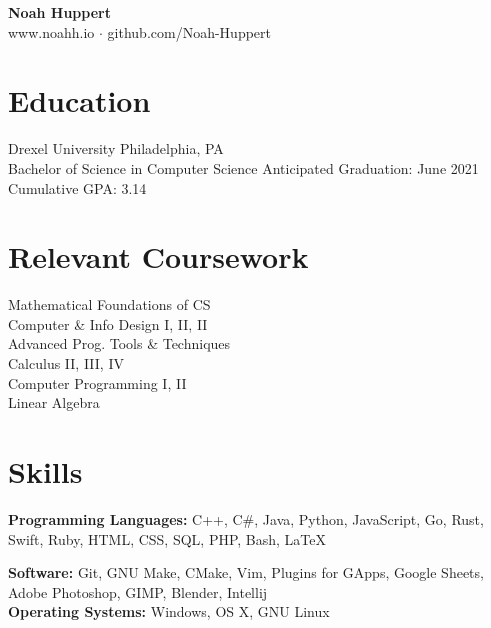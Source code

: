 \documentclass[10pt]{article}
\begin{document}
\centering
	\textbf{Noah Huppert} \\
	
	www.noahh.io $\cdot$ github.com/Noah-Huppert


\begin{flushleft}

\section{Education}
	Drexel University \hfill Philadelphia, PA \\
	Bachelor of Science in Computer Science \hfill Anticipated Graduation: June 2021 \\
	Cumulative GPA: 3.14

\section{Relevant Coursework}
	\begin{addmargin}[1em]{1em}
	\begin{multicols}{3}
		Mathematical Foundations of CS \\
		Computer \& Info Design I, II, II \\

		Advanced Prog. Tools \& Techniques \\
		Calculus II, III, IV \\

		Computer Programming I, II \\
		Linear Algebra 
	\end{multicols} 
	\end{addmargin}


\section{Skills}
	\textbf{Programming Languages:} C++, C\#, Java, Python, JavaScript, Go, Rust, Swift, Ruby, HTML, CSS, SQL, PHP, Bash, LaTeX

	\textbf{Software:} Git, GNU Make, CMake, Vim, Plugins for GApps, Google Sheets, Adobe Photoshop, GIMP, Blender, Intellij \\

	\textbf{Operating Systems:} Windows, OS X, GNU Linux


\end{flushleft}
\end{document}
